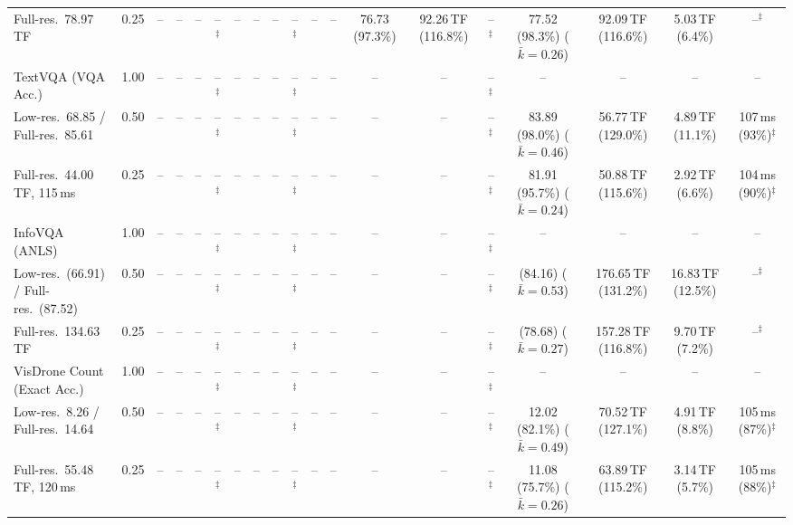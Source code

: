 \begin{table}[t]
{\begin{tabular}{l c | c c c c | c c c c | c c | c c c | c c c c}
{\footnotesize Full-res.\ 78.97\,TF} & 0.25 & -- & -- & -- & --$^\ddagger$ & -- & -- & -- & --$^\ddagger$ & -- & -- & 76.73 (97.3\%) & 92.26\,TF (116.8\%) & --$^\ddagger$ & \cellcolor{gray!15}77.52 (98.3\%) {\footnotesize ($\bar k{=}0.26$)} & 92.09\,TF (116.6\%) & 5.03\,TF (6.4\%) & --$^\ddagger$ \\
\cmidrule(lr){1-19}
TextVQA (VQA Acc.) & 1.00 & -- & -- & -- & --$^\ddagger$ & -- & -- & -- & --$^\ddagger$ & -- & -- & -- & -- & --$^\ddagger$ & -- & -- & -- & -- \\
{\footnotesize Low-res.\ 68.85 / Full-res.\ 85.61} & 0.50 & -- & -- & -- & --$^\ddagger$ & -- & -- & -- & --$^\ddagger$ & -- & -- & -- & -- & --$^\ddagger$ & 83.89 (98.0\%) {\footnotesize ($\bar k{=}0.46$)} & 56.77\,TF (129.0\%) & 4.89\,TF (11.1\%) & 107\,ms (93\%)$^\ddagger$ \\
{\footnotesize Full-res.\ 44.00\,TF, 115\,ms} & 0.25 & -- & -- & -- & --$^\ddagger$ & -- & -- & -- & --$^\ddagger$ & -- & -- & -- & -- & --$^\ddagger$ & 81.91 (95.7\%) {\footnotesize ($\bar k{=}0.24$)} & 50.88\,TF (115.6\%) & 2.92\,TF (6.6\%) & 104\,ms (90\%)$^\ddagger$ \\
\cmidrule(lr){1-19}
InfoVQA (ANLS) & 1.00 & -- & -- & -- & --$^\ddagger$ & -- & -- & -- & --$^\ddagger$ & -- & -- & -- & -- & --$^\ddagger$ & -- & -- & -- & -- \\
{\footnotesize Low-res.\ (66.91) / Full-res.\ (87.52)} & 0.50 & -- & -- & -- & --$^\ddagger$ & -- & -- & -- & --$^\ddagger$ & -- & -- & -- & -- & --$^\ddagger$ & (84.16) {\footnotesize ($\bar k{=}0.53$)} & 176.65\,TF (131.2\%) & 16.83\,TF (12.5\%) & --$^\ddagger$ \\
{\footnotesize Full-res.\ 134.63\,TF} & 0.25 & -- & -- & -- & --$^\ddagger$ & -- & -- & -- & --$^\ddagger$ & -- & -- & -- & -- & --$^\ddagger$ & (78.68) {\footnotesize ($\bar k{=}0.27$)} & 157.28\,TF (116.8\%) & 9.70\,TF (7.2\%) & --$^\ddagger$ \\
\cmidrule(lr){1-19}
VisDrone Count (Exact Acc.) & 1.00 & -- & -- & -- & --$^\ddagger$ & -- & -- & -- & --$^\ddagger$ & -- & -- & -- & -- & --$^\ddagger$ & -- & -- & -- & -- \\
{\footnotesize Low-res.\ 8.26 / Full-res.\ 14.64} & 0.50 & -- & -- & -- & --$^\ddagger$ & -- & -- & -- & --$^\ddagger$ & -- & -- & -- & -- & --$^\ddagger$ & 12.02 (82.1\%) {\footnotesize ($\bar k{=}0.49$)} & 70.52\,TF (127.1\%) & 4.91\,TF (8.8\%) & 105\,ms (87\%)$^\ddagger$ \\
{\footnotesize Full-res.\ 55.48\,TF, 120\,ms} & 0.25 & -- & -- & -- & --$^\ddagger$ & -- & -- & -- & --$^\ddagger$ & -- & -- & -- & -- & --$^\ddagger$ & 11.08 (75.7\%) {\footnotesize ($\bar k{=}0.26$)} & 63.89\,TF (115.2\%) & 3.14\,TF (5.7\%) & 105\,ms (88\%)$^\ddagger$ \\

\end{tabular}}
\end{table}
